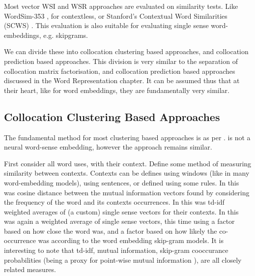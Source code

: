 \documentclass[12pt,parskip]{komatufte}
\begin{document}
Most vector WSI and WSR approaches are evaluated on similarity tests.
Like WordSim-353 \textcite{WordSim353}, for contextless, or Stanford's Contextual Word Similarities (SCWS) \textcite{Huang2012}.
This evaluation is also suitable for evaluating single sense word-embeddings, e.g. skipgrams.


We can divide these into collocation clustering based approaches,
and collocation prediction based approaches.
This division is very similar to the separation of collocation matrix factorisation,
and collocation prediction based approaches discussed in the Word Representation chapter.
It can be assumed thus that at their heart, like for word embeddings,
they are fundamentally very similar.


\subsection{Collocation Clustering Based Approaches}
The fundamental method for most clustering based approaches is as per .
\textcite{pantel2002WSI} is not a neural word-sense embedding, however the approach remains similar.




First consider all word uses, with their context.
Define some method of measuring similarity between contexts.
Contexts can be defines using windows (like in many word-embedding models),
 using sentences, or defined using some rules.
In \textcite{pantel2002WSI} this was cosine distance between the mutual information vectors found by considering the frequency of the word and its contexts occurrences.
In  this was td-idf weighted averages of (a custom) single sense vectors for their contexts.
In  this was again a weighted average of single sense vectors, this time using a factor based on how close the word was, and a factor based on how likely the co-occurrence was according to the word embedding skip-gram models.
It is interesting to note that td-idf, mutual information, skip-gram cooccurance probabilities (being a proxy for point-wise mutual information \textcite{levy2014neural}), are all closely related measures.
\end{document}
